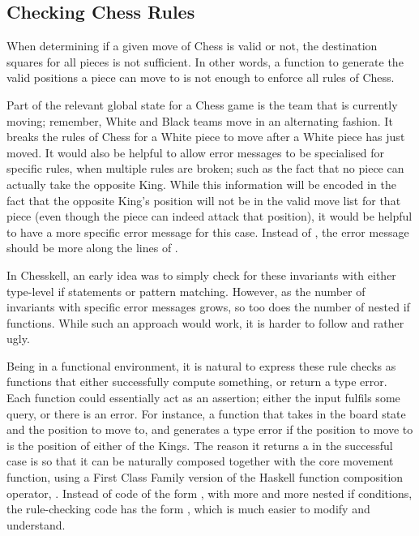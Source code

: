 \subsection{Checking Chess Rules} \label{chessrules}

When determining if a given move of Chess is valid or not, the destination squares for all pieces is not sufficient. In other words, a function to generate the valid positions a piece can move to is not enough to enforce all rules of Chess.

Part of the relevant global state for a Chess game is the team that is currently moving; remember, White and Black teams move in an alternating fashion. It breaks the rules of Chess for a White piece to move after a White piece has just moved. It would also be helpful to allow error messages to be specialised for specific rules, when multiple rules are broken; such as the fact that no piece can actually take the opposite King. While this information will be encoded in the fact that the opposite King's position will not be in the valid move list for that piece (even though the piece can indeed attack that position), it would be helpful to have a more specific error message for this case. Instead of , the error message should be more along the lines of .

In Chesskell, an early idea was to simply check for these invariants with either type-level if statements or pattern matching. However, as the number of invariants with specific error messages grows, so too does the number of nested if functions. While such an approach would work, it is harder to follow and rather ugly.

Being in a functional environment, it is natural to express these rule checks as functions that either successfully compute something, or return a type error. Each function could essentially act as an assertion; either the input fulfils some query, or there is an error. For instance, a function  that takes in the board state and the position to move to, and generates a type error if the position to move to is the position of either of the Kings. The reason it returns a  in the successful case is so that it can be naturally composed together with the core movement function, using a First Class Family version of the Haskell function composition operator, . Instead of code of the form , with more and more nested if conditions, the rule-checking code has the form , which is much easier to modify and understand.


